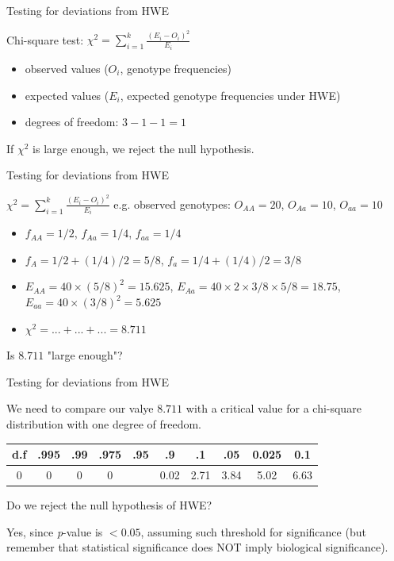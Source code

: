 \begin{frame}{Testing for deviations from HWE}

	Chi-square test: $\chi^2 = \sum_{i=1}^k \frac{(E_i - O_i)^2}{E_i}$

	\begin{itemize}
		\item observed values ($O_i$, genotype frequencies)
		\item expected values ($E_i$, expected genotype frequencies under HWE)
		\item degrees of freedom: $3-1-1=1$
	\end{itemize}

	\bigskip

        If $\chi^2$ is large enough, we reject the null hypothesis.

\end{frame}


\begin{frame}{Testing for deviations from HWE}

	\small
        $\chi^2 = \sum_{i=1}^k \frac{(E_i - O_i)^2}{E_i}$
	\bigskip
	e.g. observed genotypes: $O_{AA}=20$, $O_{Aa}=10$, $O_{aa}=10$ 

	\begin{itemize}
		\pause
		\item $f_{AA}=1/2$, $f_{Aa}=1/4$, $f_{aa}=1/4$
		\pause
		\item $f_A=1/2 + (1/4)/2 = 5/8$, $f_a=1/4 + (1/4)/2=3/8$
		\pause
		\item $E_{AA}=40 \times (5/8)^2 = 15.625$, $E_{Aa}=40 \times 2 \times 3/8 \times 5/8=18.75$, $E_{aa}=40 \times (3/8)^2 = 5.625$
		\item
		$\chi^2 = ... + ... + ... = 8.711$
	\end{itemize}

	Is $8.711$ "large enough"?

\end{frame}


\begin{frame}{Testing for deviations from HWE}

	\small

	We need to compare our valye $8.711$ with a critical value for a chi-square distribution with one degree of freedom.

	\begin{table}
	\begin{tabular}{c|c|c|c|c|c|c|c|c|c}
	\toprule
	d.f & .995 & .99 & .975 & .95 & .9 & .1 & .05 & 0.025 & 0.1\\
	\midrule
	0 & 0 & 0 & 0 & & 0.02 & 2.71 & 3.84 & 5.02 & 6.63\\
	\bottomrule
	\end{tabular}
	\end{table}

	Do we reject the null hypothesis of HWE?
	\pause

	Yes, since \textit{p}-value is $<0.05$, assuming such threshold for significance (but remember that statistical significance does NOT imply biological significance).

\end{frame}


